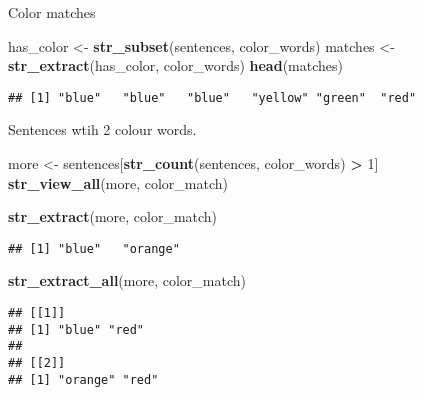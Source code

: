 \documentclass[
]{article}
\newenvironment{Shaded}{\begin{snugshade}}{\end{snugshade}}
\newcommand{\DecValTok}[1]{\textcolor[rgb]{0.00,0.00,0.81}{#1}}
\newcommand{\KeywordTok}[1]{\textcolor[rgb]{0.13,0.29,0.53}{\textbf{#1}}}
\newcommand{\NormalTok}[1]{#1}
\newcommand{\OperatorTok}[1]{\textcolor[rgb]{0.81,0.36,0.00}{\textbf{#1}}}
\newcommand{\StringTok}[1]{\textcolor[rgb]{0.31,0.60,0.02}{#1}}
\begin{document}
Color matches

\begin{Shaded}
\begin{Highlighting}[]
\NormalTok{has\_color \textless{}{-}}\StringTok{ }\KeywordTok{str\_subset}\NormalTok{(sentences, color\_words)}
\NormalTok{matches \textless{}{-}}\StringTok{ }\KeywordTok{str\_extract}\NormalTok{(has\_color, color\_words)}
\KeywordTok{head}\NormalTok{(matches)}
\end{Highlighting}
\end{Shaded}

\begin{verbatim}
## [1] "blue"   "blue"   "blue"   "yellow" "green"  "red"
\end{verbatim}

Sentences wtih 2 colour words.

\begin{Shaded}
\begin{Highlighting}[]
\NormalTok{more \textless{}{-}}\StringTok{ }\NormalTok{sentences[}\KeywordTok{str\_count}\NormalTok{(sentences, color\_words) }\OperatorTok{\textgreater{}}\StringTok{ }\DecValTok{1}\NormalTok{]}
\KeywordTok{str\_view\_all}\NormalTok{(more, color\_match)}
\end{Highlighting}
\end{Shaded}

\hypertarget{htmlwidget-0fb8cce21a5265a58f6e}{}
\begin{str_view}

\end{str_view}

\begin{Shaded}
\begin{Highlighting}[]
\KeywordTok{str\_extract}\NormalTok{(more, color\_match)}
\end{Highlighting}
\end{Shaded}

\begin{verbatim}
## [1] "blue"   "orange"
\end{verbatim}

\begin{Shaded}
\begin{Highlighting}[]
\KeywordTok{str\_extract\_all}\NormalTok{(more, color\_match)}
\end{Highlighting}
\end{Shaded}

\begin{verbatim}
## [[1]]
## [1] "blue" "red" 
## 
## [[2]]
## [1] "orange" "red"
\end{verbatim}
\end{document}
